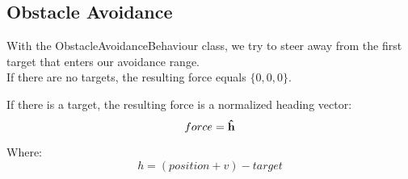 \subsection{Obstacle Avoidance}
With the ObstacleAvoidanceBehaviour class, we try to steer away from the 
first target that enters our avoidance range.\cite[pg. 99]{buckland} 
\\
If there are no targets, the resulting force equals $ \{0, 0, 0\} $.

If there is a target, the resulting force is a normalized heading vector:
\large
$$ force = \boldsymbol{\hat{\textbf{h}}} $$
\normalsize

Where: 
\large
$$ h = (position + v) - target $$
\normalsize

